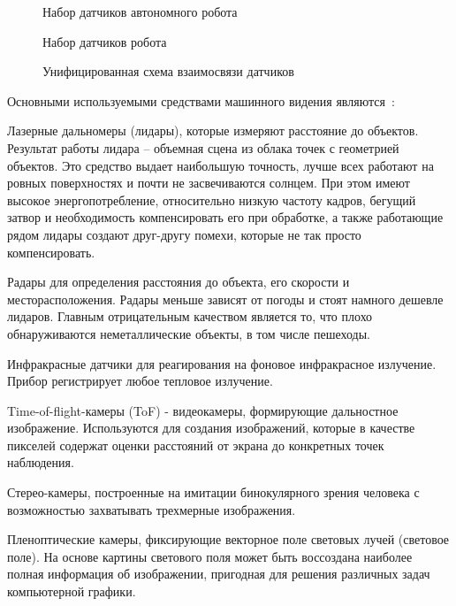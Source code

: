 \begin{figure}[ht]
    \caption{Набор датчиков автономного робота}\label{fig:robot1}
\end{figure}

\begin{figure}[ht]
    \caption{Набор датчиков робота}\label{fig:robot2}
\end{figure}

\begin{figure}[ht]
    \caption{Унифицированная схема взаимосвязи датчиков}\label{fig:sensors}
\end{figure}


Основными используемыми средствами машинного видения являются~\cite{confbib1}:

Лазерные дальномеры (лидары), которые измеряют расстояние до объектов. Результат работы лидара – объемная сцена из облака точек с геометрией объектов. Это средство выдает наибольшую точность, лучше всех работают на ровных поверхностях и почти не засвечиваются солнцем. При этом имеют высокое энергопотребление, относительно низкую частоту кадров, бегущий затвор и необходимость компенсировать его при обработке, а также работающие рядом лидары создают друг-другу помехи, которые не так просто компенсировать.

Радары для определения расстояния до объекта, его скорости и месторасположения. Радары меньше зависят от погоды и стоят намного дешевле лидаров. Главным отрицательным качеством является то, что плохо обнаруживаются неметаллические объекты, в том числе пешеходы.

Инфракрасные датчики для реагирования на фоновое инфракрасное излучение. Прибор регистрирует любое тепловое излучение.

Time-of-flight-камеры (ToF) - видеокамеры, формирующие дальностное изображение. Используются для создания изображений, которые в качестве пикселей содержат оценки расстояний от экрана до конкретных точек наблюдения.

Стерео-камеры, построенные на имитации бинокулярного зрения человека с возможностью захватывать трехмерные изображения.

Пленоптические камеры, фиксирующие векторное поле световых лучей (световое поле). На основе картины светового поля может быть воссоздана наиболее полная информация об изображении, пригодная для решения различных задач компьютерной графики.

